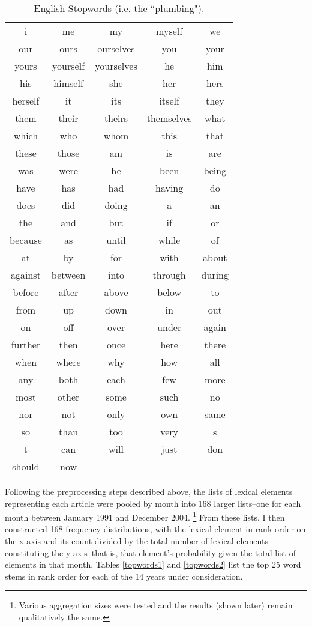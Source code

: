 \begin{table}
\begin{center}
\caption[English Stopwords]{English Stopwords (i.e. the ``plumbing"). \label{stop}}
\vspace{0.3in}
\begin{tabular}{ccccc}
\hline 
\hline
i & me & my & myself & we \\
our & ours & ourselves & you & your \\
yours & yourself & yourselves & he & him \\
his & himself & she & her & hers\\
herself & it & its & itself & they\\
them & their & theirs & themselves & what \\
which & who & whom & this & that \\
these & those & am & is & are\\
was & were & be & been & being \\
have & has & had & having & do\\
does & did & doing & a & an \\
the & and & but & if & or \\
because & as & until & while & of \\
at & by & for & with & about \\
against & between & into & through & during \\
before & after & above & below & to \\
from & up & down & in & out \\
on & off & over & under & again \\
further & then & once & here & there \\
when & where & why & how & all \\
any & both & each & few & more \\
most & other & some & such & no \\
nor & not & only & own & same \\
so & than & too & very & s \\
t & can & will & just & don \\
should & now & & & \\
\hline
\end{tabular}
\end{center}
\end{table}

Following the preprocessing steps described above, the lists of lexical elements representing each article were pooled by month into 168 larger lists--one for each month between January 1991 and December 2004. \footnote{Various aggregation sizes were tested and the results (shown later) remain qualitatively the same.} From these lists, I then constructed 168 frequency distributions, with the lexical element in rank order on the x-axis and its count divided by the total number of lexical elements constituting the y-axis--that is, that element's probability given the total list of elements in that month. Tables \ref{topwords1} and \ref{topwords2} list the top 25 word stems in rank order for each of the 14 years under consideration. 

